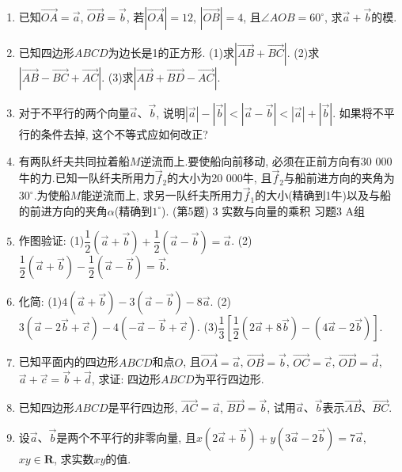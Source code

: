 \documentclass[10pt,a4paper]{article}
\begin{document}
\begin{enumerate}[1.]
\item 已知$\overrightarrow {OA}=\overrightarrow a$, $\overrightarrow {OB}=\overrightarrow b$, 若$|\overrightarrow {OA}|=12$, $|\overrightarrow {OB}|=4$, 且$\angle AOB=60^{\circ }$, 求$\overrightarrow a+\overrightarrow b$的模.
\item 已知四边形$ABCD$为边长是1的正方形.
(1)求$|\overrightarrow {AB}+\overrightarrow {BC}|$.						(2)求$|\overrightarrow {AB}-\overrightarrow {BC}+\overrightarrow {AC}|$.
(3)求$|\overrightarrow {AB}+\overrightarrow {BD}-\overrightarrow {AC}|$.
\item 对于不平行的两个向量$\overrightarrow a$、$\overrightarrow b$, 说明$|\overrightarrow a|-|\overrightarrow b|<|\overrightarrow a-\overrightarrow b|<|\overrightarrow a|+|\overrightarrow b|$.
如果将不平行的条件去掉, 这个不等式应如何改正?
\item 有两队纤夫共同拉着船$M$逆流而上.要使船向前移动, 必须在正前方向有30 000牛的力.已知一队纤夫所用力$\overrightarrow f_2$的大小为20 000牛, 且$\overrightarrow f_2$与船前进方向的夹角为$30^{\circ }$.为使船$M$能逆流而上, 求另一队纤夫所用力$\overrightarrow f_1$的大小(精确到1牛)以及与船的前进方向的夹角$\alpha$(精确到$1^{\circ }$).
(第5题)
3  实数与向量的乘积
习题3  A组
\item 作图验证:
(1)$\dfrac 12(\overrightarrow a+\overrightarrow b)+\dfrac 12(\overrightarrow a-\overrightarrow b)=\overrightarrow a$.				(2)$\dfrac 12(\overrightarrow a+\overrightarrow b)-\dfrac 12(\overrightarrow a-\overrightarrow b)=\overrightarrow b$.
\item 化简:
(1)$4(\overrightarrow a+\overrightarrow b)-3(\overrightarrow a-\overrightarrow b)-8\overrightarrow a$.				(2)$3(\overrightarrow a-2\overrightarrow b+\overrightarrow c)-4(-\overrightarrow a-\overrightarrow b+\overrightarrow c)$.
(3)$\dfrac 13[\dfrac 12(2\overrightarrow a+8\overrightarrow b)-(4\overrightarrow a-2\overrightarrow b)]$.
\item 已知平面内的四边形$ABCD$和点$O$, 且$\overrightarrow {OA}=\overrightarrow a$, $\overrightarrow {OB}=\overrightarrow b$, $\overrightarrow {OC}=\overrightarrow c$, $\overrightarrow {OD}=\overrightarrow d$, $\overrightarrow a+\overrightarrow c=\overrightarrow b+\overrightarrow d$, 求证: 四边形$ABCD$为平行四边形.
\item 已知四边形$ABCD$是平行四边形, $\overrightarrow {AC}=\overrightarrow a$, $\overrightarrow {BD}=\overrightarrow b$, 试用$\overrightarrow a$、$\overrightarrow b$表示$\overrightarrow {AB}$、$\overrightarrow {BC}$.
\item 设$\overrightarrow a$、$\overrightarrow b$是两个不平行的非零向量, 且$x(2\overrightarrow a+\overrightarrow b)+y(3\overrightarrow a-2\overrightarrow b)=7\overrightarrow a$, $xy\in \mathbf{R}$, 求实数$xy$的值.

\end{enumerate}
\end{document}

